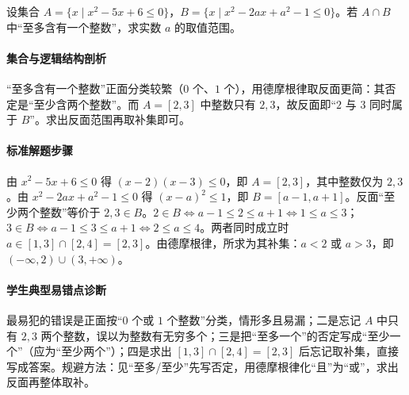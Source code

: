 \begin{problem}
设集合 $A=\{x\mid x^2-5x+6\leq0\}$，$B=\{x\mid x^2-2ax+a^2-1\leq0\}$。若 $A\cap B$ 中“至多含有一个整数”，求实数 $a$ 的取值范围。
\end{problem}
\begin{solution}
\paragraph{集合与逻辑结构剖析}
“至多含有一个整数”正面分类较繁（$0$ 个、$1$ 个），用德摩根律取反面更简：其否定是“至少含两个整数”。而 $A=[2,3]$ 中整数只有 $2,3$，故反面即“$2$ 与 $3$ 同时属于 $B$”。求出反面范围再取补集即可。
\paragraph{标准解题步骤}
由 $x^2-5x+6\leq0$ 得 $(x-2)(x-3)\leq0$，即 $A=[2,3]$，其中整数仅为 $2,3$。由 $x^2-2ax+a^2-1\leq0$ 得 $(x-a)^2\leq1$，即 $B=[a-1,a+1]$。反面“至少两个整数”等价于 $2,3\in B$。$2\in B\iff a-1\leq2\leq a+1\iff1\leq a\leq3$；$3\in B\iff a-1\leq3\leq a+1\iff2\leq a\leq4$。两者同时成立时 $a\in[1,3]\cap[2,4]=[2,3]$。由德摩根律，所求为其补集：$a<2$ 或 $a>3$，即 $(-\infty,2)\cup(3,+\infty)$。
\paragraph{学生典型易错点诊断}
最易犯的错误是正面按“$0$ 个或 $1$ 个整数”分类，情形多且易漏；二是忘记 $A$ 中只有 $2,3$ 两个整数，误以为整数有无穷多个；三是把“至多一个”的否定写成“至少一个”（应为“至少两个”）；四是求出 $[1,3]\cap[2,4]=[2,3]$ 后忘记取补集，直接写成答案。规避方法：见“至多/至少”先写否定，用德摩根律化“且”为“或”，求出反面再整体取补。
\end{solution}

